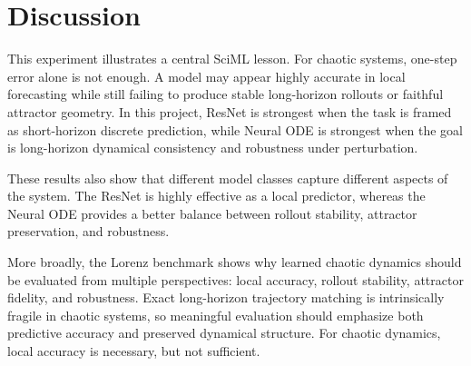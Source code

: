 \documentclass[conference]{IEEEtran}
\begin{document}
\section{Discussion}
This experiment illustrates a central SciML lesson. For chaotic systems, one-step error alone is not enough. A model may appear highly accurate in local forecasting while still failing to produce stable long-horizon rollouts or faithful attractor geometry. In this project, ResNet is strongest when the task is framed as short-horizon discrete prediction, while Neural ODE is strongest when the goal is long-horizon dynamical consistency and robustness under perturbation.

These results also show that different model classes capture different aspects of the system. The ResNet is highly effective as a local predictor, whereas the Neural ODE provides a better balance between rollout stability, attractor preservation, and robustness.

More broadly, the Lorenz benchmark shows why learned chaotic dynamics should be evaluated from multiple perspectives: local accuracy, rollout stability, attractor fidelity, and robustness. Exact long-horizon trajectory matching is intrinsically fragile in chaotic systems, so meaningful evaluation should emphasize both predictive accuracy and preserved dynamical structure. For chaotic dynamics, local accuracy is necessary, but not sufficient.
\end{document}

